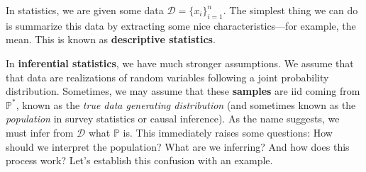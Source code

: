 In statistics, we are given some data $\mathcal{D} = \{x_i\}_{i=1}^n$. The simplest thing we can do is summarize this data by extracting some nice characteristics---for example, the mean. This is known as \textbf{descriptive statistics}. 

In \textbf{inferential statistics}, we have much stronger assumptions. We assume that that data are realizations of random variables following a joint probability distribution. Sometimes, we may assume that these \textbf{samples} are iid coming from $\mathbb{P}^\ast$, known as the \textit{true data generating distribution} (and sometimes known as the \textit{population} in survey statistics or causal inference). As the name suggests, we must infer from $\mathcal{D}$ what $\mathbb{P}$ is. This immediately raises some questions: How should we interpret the population? What are we inferring? And how does this process work? Let's establish this confusion with an example. 

